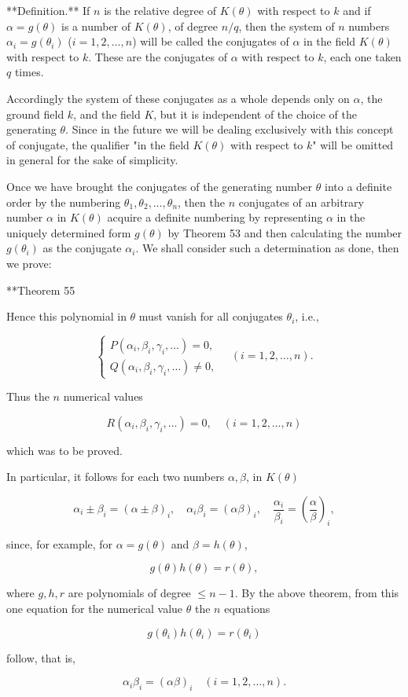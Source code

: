 **Definition.** If $n$ is the relative degree of $K(\theta)$ with respect to $k$ and if $\alpha = g(\theta)$ is a number of $K(\theta)$, of degree $n/q$, then the system of $n$ numbers $\alpha_i = g(\theta_i)$ ($i = 1, 2, \ldots, n$) will be called the conjugates of $\alpha$ in the field $K(\theta)$ with respect to $k$. These are the conjugates of $\alpha$ with respect to $k$, each one taken $q$ times.

Accordingly the system of these conjugates as a whole depends only on $\alpha$, the ground field $k$, and the field $K$, but it is independent of the choice of the generating $\theta$. Since in the future we will be dealing exclusively with this concept of conjugate, the qualifier "in the field $K(\theta)$ with respect to $k$" will be omitted in general for the sake of simplicity.

Once we have brought the conjugates of the generating number $\theta$ into a definite order by the numbering $\theta_1, \theta_2, \ldots, \theta_n$, then the $n$ conjugates of an arbitrary number $\alpha$ in $K(\theta)$ acquire a definite numbering by representing $\alpha$ in the uniquely determined form $g(\theta)$ by Theorem 53 and then calculating the number $g(\theta_i)$ as the conjugate $\alpha_i$. We shall consider such a determination as done, then we prove:

**Theorem 55

Hence this polynomial in $\theta$ must vanish for all conjugates $\theta_i$, i.e.,

$$\begin{cases} P(\alpha_i, \beta_i, \gamma_i, \ldots) = 0, \\ Q(\alpha_i, \beta_i, \gamma_i, \ldots) \neq 0, \end{cases} \quad (i = 1, 2, \ldots, n).$$

Thus the $n$ numerical values

$$R(\alpha_i, \beta_i, \gamma_i, \ldots) = 0, \quad (i = 1, 2, \ldots, n)$$

which was to be proved.

In particular, it follows for each two numbers $\alpha, \beta$, in $K(\theta)$

$$\alpha_i \pm \beta_i = (\alpha \pm \beta)_i, \quad \alpha_i \beta_i = (\alpha \beta)_i, \quad \frac{\alpha_i}{\beta_i} = \left( \frac{\alpha}{\beta} \right)_i,$$

since, for example, for $\alpha = g(\theta)$ and $\beta = h(\theta)$,

$$g(\theta)h(\theta) = r(\theta),$$

where $g, h, r$ are polynomials of degree $\leq n - 1$. By the above theorem, from this one equation for the numerical value $\theta$ the $n$ equations

$$g(\theta_i)h(\theta_i) = r(\theta_i)$$

follow, that is,

$$\alpha_i \beta_i = (\alpha \beta)_i \quad (i = 1, 2, \ldots, n).$$
